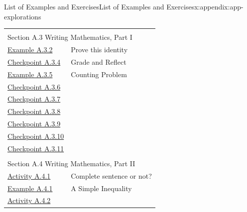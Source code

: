 \documentclass[oneside,10pt,]{book}
\numberwithin{equation}{section}
\providecommand\phantomsection{}
\begin{document}
\begin{appendixptx}{List of Examples and Exercises}{}{List of Examples and Exercises}{}{}{x:appendix:app-explorations}
\begin{longtable}[l]{ll}
\multicolumn{2}{l}{\null}\\[1.5ex] \multicolumn{2}{l}{\large Section A.3 Writing Mathematics, Part I}\\[0.5ex]
\hyperref[x:example:eg-evaluate-1]{Example A.3.2}& Prove this identity\\
\hyperref[x:exercise:ex-writing-induction-guide]{Checkpoint A.3.4}& Grade and Reflect\\
\hyperref[x:example:eg-evaluate-2]{Example A.3.5}& Counting Problem\\
\hyperref[x:exercise:ex-evaluate-2-a]{Checkpoint A.3.6}& \\
\hyperref[x:exercise:ex-evaluate-2-no-sentence]{Checkpoint A.3.7}& \\
\hyperref[x:exercise:ex-evaluate-2-3]{Checkpoint A.3.8}& \\
\hyperref[x:exercise:ex-evaluate-2-a1b0]{Checkpoint A.3.9}& \\
\hyperref[x:exercise:ex-evaluate-2-2]{Checkpoint A.3.10}& \\
\hyperref[x:exercise:ex-evaluate-2-3b]{Checkpoint A.3.11}& \\
\multicolumn{2}{l}{\null}\\[1.5ex] \multicolumn{2}{l}{\large Section A.4 Writing Mathematics, Part II}\\[0.5ex]
\hyperref[x:activity:ex-writing-grammar]{Activity A.4.1}& Complete sentence or not?\\
\hyperref[x:example:eg-writing-two-column]{Example A.4.1}& A Simple Inequality\\
\hyperref[x:activity:exe-review-proof-writing]{Activity A.4.2}& \\
\end{longtable}
\end{appendixptx}
%
\backmatter%
%
\clearpage\phantomsection%
%
%
%
\typeout{************************************************}
\typeout{************************************************}
%
\end{document}
